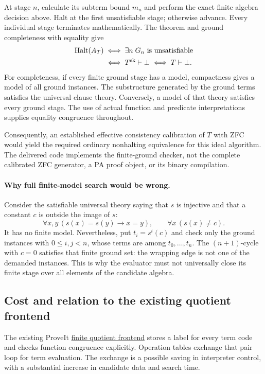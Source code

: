 At stage $n$, calculate its subterm bound $m_n$ and perform the exact finite
algebra decision above.  Halt at the first unsatisfiable stage; otherwise
advance.  Every individual stage terminates mathematically.  The theorem and
ground completeness with equality give
\[
 \begin{aligned}
 \operatorname{Halt}(A_T)
 &\iff\exists n\;G_n\text{ is unsatisfiable}\\
 &\iff T^{\rm sk}\vdash\bot
  \iff T\vdash\bot.
 \end{aligned}
\]
For completeness, if every finite ground stage has a model, compactness
gives a model of all ground instances.  The substructure generated by the
ground terms satisfies the universal clause theory.  Conversely, a model
of that theory satisfies every ground stage.  The use of actual function
and predicate interpretations supplies equality congruence throughout.

Consequently, an established effective consistency calibration of $T$ with
ZFC would yield the required ordinary nonhalting equivalence for this ideal
algorithm.  The delivered code implements the finite-ground checker, not
the complete calibrated ZFC generator, a PA proof object, or its binary
compilation.

\paragraph{Why full finite-model search would be wrong.}
Consider the satisfiable universal theory saying that $s$ is injective and
that a constant $c$ is outside the image of $s$:
\[
 \forall x,y\,(s(x)=s(y)\to x=y),\qquad
 \forall x\,(s(x)\ne c).
\]
It has no finite model.  Nevertheless, put $t_i=s^i(c)$ and check only
the ground instances with $0\le i,j<n$, whose terms are among
$t_0,\ldots,t_n$.  The $(n+1)$-cycle with $c=0$ satisfies that finite
ground set: the wrapping edge is not one of the demanded instances.
This is why the evaluator must not universally close its finite stage over
all elements of the candidate algebra.

\subsection{Cost and relation to the existing quotient frontend}

The existing ProveIt
\href{https://github.com/VladimirReshetnikov/ProveIt/blob/main/Computability/BusyBeaver/Research/ZFC/finite_quotient_frontend.md}
{finite quotient frontend} stores a label for every term code and checks
function congruence explicitly.  Operation tables exchange that pair loop
for term evaluation.  The exchange is a possible saving in interpreter
control, with a substantial increase in candidate data and search time.

